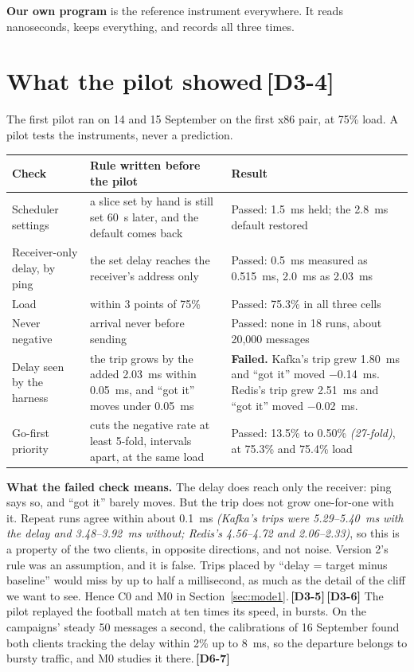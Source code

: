 \documentclass[11pt]{article}
\newcommand{\gl}[1]{{\color{soft}\itshape\small (#1)}}
\newcommand{\chgold}[1]{\,{\color{oldcol}\bfseries\footnotesize[#1]}}
\begin{document}
\textbf{Our own program} is the reference instrument everywhere. It reads nanoseconds, keeps everything, and records all three times.

\section[What the pilot showed]{What the pilot showed\protect\chgold{D3-4}}\label{sec:pilot}
The first pilot ran on 14 and 15 September on the first x86 pair, at 75\% load. A pilot tests the instruments, never a prediction.

{\small
\begin{tabularx}{\linewidth}{@{}>{\raggedright\arraybackslash}p{3.0cm} >{\raggedright\arraybackslash}X >{\raggedright\arraybackslash}p{6.2cm}@{}}
\toprule
\textbf{Check} & \textbf{Rule written before the pilot} & \textbf{Result} \\
\midrule
Scheduler settings & a slice set by hand is still set 60~s later, and the default comes back & Passed: 1.5~ms held; the 2.8~ms default restored \\
Receiver-only delay, by ping & the set delay reaches the receiver's address only & Passed: 0.5~ms measured as 0.515~ms, 2.0~ms as 2.03~ms \\
Load & within 3 points of 75\% & Passed: 75.3\% in all three cells \\
Never negative & arrival never before sending & Passed: none in 18 runs, about 20,000 messages \\
Delay seen by the harness & the trip grows by the added 2.03~ms within 0.05~ms, and ``got it'' moves under 0.05~ms & \textbf{Failed.} Kafka's trip grew 1.80~ms and ``got it'' moved $-$0.14~ms. Redis's trip grew 2.51~ms and ``got it'' moved $-$0.02~ms. \\
Go-first priority & cuts the negative rate at least 5-fold, intervals apart, at the same load & Passed: 13.5\% to 0.50\% \gl{27-fold}, at 75.3\% and 75.4\% load \\
\bottomrule
\end{tabularx}}

\textbf{What the failed check means.} The delay does reach only the receiver: ping says so, and ``got it'' barely moves. But the trip does not grow one-for-one with it. Repeat runs agree within about 0.1~ms \gl{Kafka's trips were 5.29--5.40~ms with the delay and 3.48--3.92~ms without; Redis's 4.56--4.72 and 2.06--2.33}, so this is a property of the two clients, in opposite directions, and not noise. Version 2's rule was an assumption, and it is false. Trips placed by ``delay = target minus baseline'' would miss by up to half a millisecond, as much as the detail of the cliff we want to see. Hence C0 and M0 in Section~\ref{sec:mode1}.\chgold{D3-5}\chgold{D3-6} The pilot replayed the football match at ten times its speed, in bursts. On the campaigns' steady 50 messages a second, the calibrations of 16 September found both clients tracking the delay within 2\% up to 8~ms, so the departure belongs to bursty traffic, and M0 studies it there.\chgold{D6-7}
\end{document}
